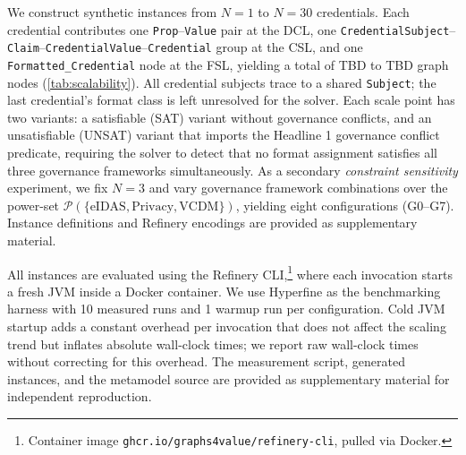 We construct synthetic instances from \(N{=}1\) to \(N{=}30\) credentials. Each credential contributes one \texttt{Prop}--\texttt{Value} pair at the DCL, one \texttt{CredentialSubject}--\texttt{Claim}--\texttt{CredentialValue}--\texttt{Credential} group at the CSL, and one \texttt{Formatted\_Credential} node at the FSL,  yielding a total of TBD to TBD graph nodes (\autoref{tab:scalability}). All credential subjects trace to a shared \texttt{Subject}; the last credential's format class is left unresolved for the solver. Each scale point has two variants: a satisfiable (SAT) variant without governance conflicts, and an unsatisfiable (UNSAT) variant that imports the Headline 1 governance conflict predicate, requiring the solver to detect that no format assignment satisfies all three governance frameworks simultaneously. As a secondary \emph{constraint sensitivity} experiment, we fix \(N{=}3\) and vary governance framework combinations over the power-set \(\mathcal{P}(\{\text{eIDAS}, \text{Privacy}, \text{VCDM}\})\), yielding eight configurations (G0--G7). Instance definitions and Refinery encodings are provided as supplementary material.

All instances are evaluated using the Refinery CLI,\footnote{Container image \texttt{ghcr.io/graphs4value/refinery-cli}, pulled via Docker.} where each invocation starts a fresh JVM inside a Docker container. We use Hyperfine as the benchmarking harness with 10 measured runs and 1 warmup run per configuration.  Cold JVM startup adds a constant overhead per invocation that does not affect the scaling trend but inflates absolute wall-clock times; we report raw wall-clock times without correcting for this overhead. The measurement script, generated instances, and the metamodel source are provided as supplementary material for independent reproduction.


